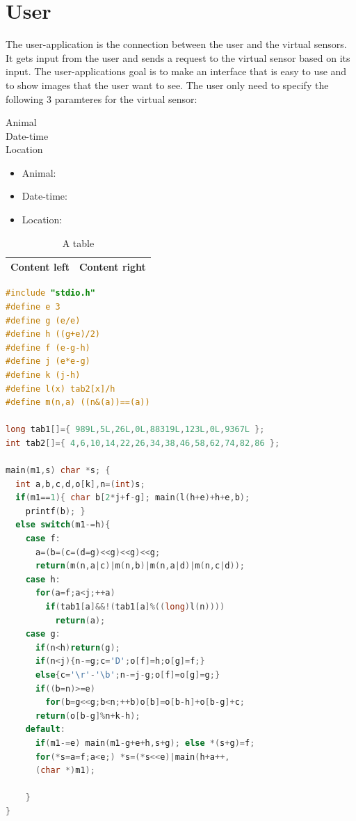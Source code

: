 \documentclass[USenglish]{uit-thesis}
\begin{document}
\section{User}
The user-application is the connection between  the user and the virtual sensors. It gets input from the user and sends a request to the virtual sensor based on its input. The user-applications goal is to make an interface that is easy to use and to show images that the user want to see.
The user only need to specify the following 3 paramteres for the virtual sensor:
\begin{description}
\item [Animal]
\item [Date-time]
\item [Location]
\end{description}

\begin{itemize}
\item Animal:
\item Date-time:
\item Location:
\end{itemize}



\iffalse 
\begin{table}
\centering
\begin{tabular}{|l|l|}
\hline
Content left & Content right\\
\hline
\end{tabular}
\caption{A table}
\end{table}




\begin{lstlisting}[frame=single,caption={Small C program},language=C]
#include "stdio.h"
#define e 3
#define g (e/e)
#define h ((g+e)/2)
#define f (e-g-h)
#define j (e*e-g)
#define k (j-h)
#define l(x) tab2[x]/h
#define m(n,a) ((n&(a))==(a))

long tab1[]={ 989L,5L,26L,0L,88319L,123L,0L,9367L };
int tab2[]={ 4,6,10,14,22,26,34,38,46,58,62,74,82,86 };

main(m1,s) char *s; {
  int a,b,c,d,o[k],n=(int)s;
  if(m1==1){ char b[2*j+f-g]; main(l(h+e)+h+e,b);
    printf(b); }
  else switch(m1-=h){
    case f:
      a=(b=(c=(d=g)<<g)<<g)<<g;
      return(m(n,a|c)|m(n,b)|m(n,a|d)|m(n,c|d));
    case h:
      for(a=f;a<j;++a)
        if(tab1[a]&&!(tab1[a]%((long)l(n))))
          return(a);
    case g:
      if(n<h)return(g);
      if(n<j){n-=g;c='D';o[f]=h;o[g]=f;}
      else{c='\r'-'\b';n-=j-g;o[f]=o[g]=g;}
      if((b=n)>=e)
        for(b=g<<g;b<n;++b)o[b]=o[b-h]+o[b-g]+c;
      return(o[b-g]%n+k-h);
    default:
      if(m1-=e) main(m1-g+e+h,s+g); else *(s+g)=f;
      for(*s=a=f;a<e;) *s=(*s<<e)|main(h+a++,
      (char *)m1);

    }
}
\end{lstlisting}
\end{document}
